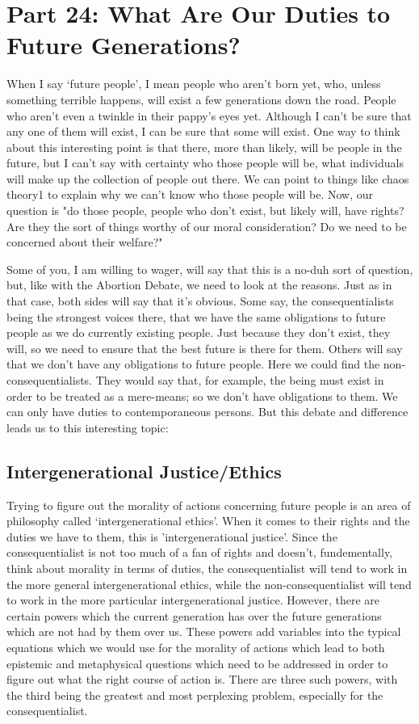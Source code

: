 \chapter{Part 24: What Are Our Duties to Future Generations?}
When I say ‘future people’, I mean people who aren’t born yet, who, unless something terrible happens, will exist a few generations down the road. People who aren’t even a twinkle in their pappy’s eyes yet. Although I can’t be sure that any one of them will exist, I can be sure that some will exist. One way to think about this interesting point is that there, more than  likely, will be people in the future, but I can't say with certainty who those people will be, what individuals will make up the collection of people out there. We can point to things like chaos theory1 to explain why we can't know who those people will be.  Now, our question is "do those people, people who don't exist, but likely will, have rights? Are they the sort of things worthy of our moral consideration? Do we need to be concerned about their welfare?"

Some of you, I am willing to wager, will say that this is a no-duh sort of question, but, like with the Abortion Debate, we need to look at the reasons. Just as in that case, both sides will say that it's obvious. Some say, the consequentialists being the strongest voices there, that we have the same obligations to future people as we do currently existing people. Just because they don't exist, they will, so we need to ensure that the best future is there for them. Others will say that we don't have any obligations to future people. Here we could find the non-consequentialists. They would say that, for example, the being must exist in order to be treated as a mere-means; so we don't have obligations to them. We can only have duties to contemporaneous persons. But this debate and difference leads us to this interesting topic:
\section{Intergenerational Justice/Ethics}

Trying to figure out the morality of actions concerning future people is an area of philosophy called ‘intergenerational ethics’. When it comes to their rights and the duties we have to them, this is 'intergenerational justice'. Since the consequentialist is not too much of a fan of rights and doesn't, fundementally, think about morality in terms of duties, the consequentialist will tend to work in the more general intergenerational ethics, while the non-consequentialist will tend to work in the more particular intergenerational justice. However, there are certain powers which the current generation has over the future generations which are not had by them over us. These powers add variables into the typical equations which we would use for the morality of actions which lead to both epistemic and metaphysical questions which need to be addressed in order to figure out what the right course of action is. There are three such powers, with the third being the greatest and most perplexing problem, especially for the consequentialist.
